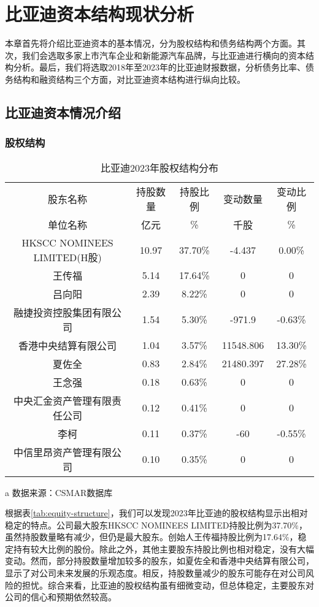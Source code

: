 \chapter{比亚迪资本结构现状分析}
本章首先将介绍比亚迪资本的基本情况，分为股权结构和债务结构两个方面。其次，我们会选取多家上市汽车企业和新能源汽车品牌，与比亚迪进行横向的资本结构分析。最后，我们将选取2018年至2023年的比亚迪财报数据，分析债务比率、债务结构和融资结构三个方面，对比亚迪资本结构进行纵向比较。
\section{比亚迪资本情况介绍}
\subsection{股权结构}
\begin{table}
  \centering
  \begin{threeparttable}[c]
    \caption{比亚迪2023年股权结构分布}
    \label{tab:equity-structure}
    \begin{tabular}{ccccc}
      \toprule
        股东名称 & 持股数量 & 持股比例 & 变动数量 & 变动比例 \\ 
        单位名称 & 亿元    &  \%      &  千股   &  \%      \\
      \midrule
        HKSCC NOMINEES LIMITED(H股) & 10.97  & 37.70\% & -4.437 & 0.00\% \\ 
        王传福 & 5.14  & 17.64\% & 0 & 0 \\ 
        吕向阳 & 2.39  & 8.22\% & 0 & 0 \\ 
        融捷投资控股集团有限公司 & 1.54  & 5.30\% & -971.9 & -0.63\% \\ 
        香港中央结算有限公司 & 1.04  & 3.57\% & 11548.806 & 13.30\% \\ 
        夏佐全 & 0.83  & 2.84\% & 21480.397 & 27.28\% \\ 
        王念强 & 0.18  & 0.63\% & 0 & 0 \\ 
        中央汇金资产管理有限责任公司 & 0.12  & 0.41\% & 0 & 0 \\ 
        李柯 & 0.11  & 0.37\% & -60 & -0.55\% \\ 
        中信里昂资产管理有限公司 & 0.10  & 0.35\% & 0 & 0 \\ 
      \bottomrule
    \end{tabular}
    \begin{tablenotes}
      \item [a] 数据来源：CSMAR数据库
    \end{tablenotes}
  \end{threeparttable}
\end{table}
根据表\eqref{tab:equity-structure}，我们可以发现2023年比亚迪的股权结构显示出相对稳定的特点。公司最大股东HKSCC NOMINEES LIMITED持股比例为37.70\%，虽然持股数量略有减少，但仍是最大股东。创始人王传福持股比例为17.64\%，稳定持有较大比例的股份。除此之外，其他主要股东持股比例也相对稳定，没有大幅变动。然而，部分持股数量增加较多的股东，如夏佐全和香港中央结算有限公司，显示了对公司未来发展的乐观态度。相反，持股数量减少的股东可能存在对公司风险的担忧。综合来看，比亚迪的股权结构虽有细微变动，但总体稳定，主要股东对公司的信心和预期依然较高。
